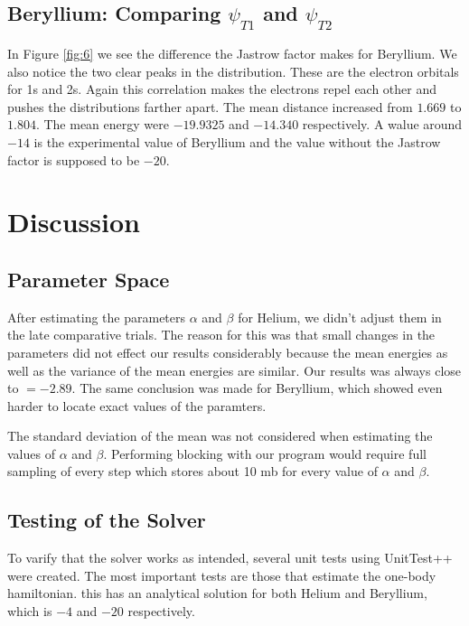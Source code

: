 \documentclass[twocolumn]{article}[10pt]
\begin{document}
\subsection{Beryllium: Comparing $\psi_{T1}$ and $\psi_{T2}$}
In Figure \ref{fig:6} we see the difference the Jastrow factor makes for Beryllium. 
We also notice the two clear peaks in the distribution. These are
the electron orbitals for 1s and 2s. Again this
correlation makes the electrons repel each other and pushes the distributions
farther apart. The mean distance increased from $1.669$ to $1.804$. 
The mean energy were $-19.9325$ and $-14.340$ respectively. A walue around
$-14$ is the experimental value of Beryllium and the value without the 
Jastrow factor is supposed to be $-20$. 




\section{Discussion}
\subsection{Parameter Space}
After estimating the parameters $\alpha$ and $\beta$ for 
Helium, we didn't adjust them in the late comparative trials. The reason
for this was that small changes in the parameters did not effect
our results considerably because the mean energies as well as the variance of the mean energies are similar. Our results was always close to 
$=-2.89$. The same conclusion was made for Beryllium, which
showed even harder to locate exact values of the paramters.  

The standard deviation of the mean was not considered when estimating the values 
of $\alpha$ and $\beta$. Performing blocking with our program would require full 
sampling of every step which stores about 10 mb for every value of $\alpha$ and $\beta$. 
\subsection{Testing of the Solver}
To varify that the solver works as intended, several unit tests
using UnitTest++ were created. The most important tests 
are those that estimate the one-body hamiltonian. this has
an analytical solution for both Helium and Beryllium, which is $-4$
and $-20$ respectively. 
\end{document}
